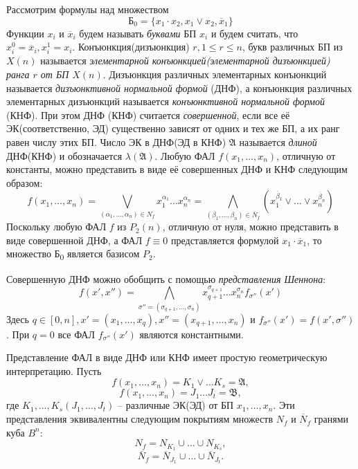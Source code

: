 \documentclass[11pt]{article}
\newcounter{th}\setcounter{th}{0}
\begin{document}
Рассмотрим формулы над множеством
\begin{equation*}
\text{Б}_0 = \{x_1\cdot x_2, x_1\vee x_2, \overline{x}_1\}
\end{equation*}
Функции \(x_i\) и \(\overline{x}_i\) будем называть \emph{буквами} БП \(x_i\) и будем считать, что
\(x_i^0 = \overline{x}_i, x_i^1 = x_i\). Конъюнкция(дизъюнкция) \(r, 1 \leq r \leq n\), букв различных БП из \(X(n)\) называется \emph{элементарной конъюнкцией(элементарной дизъюнкцией) ранга \(r\) от БП \(X(n)\)}. Дизъюнкция различных элементарных конъюнкций называется \emph{дизъюнктивной нормальной формой} (ДНФ), а конъюнкция различных элементарных дизъюнкций называется \emph{конъюнктивной нормальной формой} (КНФ). При этом ДНФ (КНФ) считается \emph{совершенной}, если все её ЭК(соответственно, ЭД) существенно зависят от одних и тех же БП, а их ранг равен числу этих БП. Число ЭК в ДНФ(ЭД в КНФ) \(\mathfrak{A}\) называется \emph{длиной} ДНФ(КНФ) и обозначается \(\lambda(\mathfrak{A})\). Любую ФАЛ \(f(x_1, \ldots, x_n)\), отличную от константы, можно представить в виде её совершенных ДНФ и КНФ следующим образом:
\begin{equation}
f(x_1, \ldots, x_n) = \bigvee\limits_{(\alpha_1, \ldots, \alpha_n) \in N_f}x_1^{\alpha_1}\ldots x_n^{\alpha_n} =
\bigwedge\limits_{(\beta_1, \ldots, \beta_n) \in \overline{N}_f}(x_1^{\overline{\beta}_1}\lor\ldots\lor x_n^{\overline{\beta}_n})
\end{equation}
Поскольку любую ФАЛ \(f\) из \(P_2(n)\), отличную от нуля, можно представить в виде совершенной ДНФ, а ФАЛ \(f \equiv 0\) представляется формулой \(x_1\cdot\overline{x}_1\), то множество Б\textsubscript{0} является базисом \(P_2\).

Совершенную ДНФ можно обобщить с помощью \emph{представления Шеннона}:
\begin{equation}
f(x', x'') = \bigwedge\limits_{\sigma'' = (\sigma_{q + 1}, \ldots, \sigma_n)}x_{q + 1}^{\sigma_{q + 1}}\ldots
x_n^{\sigma_n}f_{\sigma''}(x')
\end{equation}
Здесь \(q \in [0, n], x' = (x_1, \ldots, x_q), x'' = (x_{q + 1}, \ldots, x_n)\) и \(f_{\sigma''}(x') = f(x', \sigma'')\). При \(q = 0\) все ФАЛ \(f_{\sigma''}(x')\) являются константными.

Представление ФАЛ в виде ДНФ или КНФ имеет простую геометрическую интерпретацию. Пусть
\begin{equation}
\label{eq:dnf}
f(x_1, \ldots, x_n) = K_1 \lor \ldots K_s = \mathfrak{A},
\end{equation}
\begin{equation}
\label{eq:knf}
f(x_1, \ldots, x_n) = J_1\ldots J_t = \mathfrak{B},
\end{equation}
где \(K_1, \ldots, K_s(J_1, \ldots, J_t)\) -- различные ЭК(ЭД) от БП \(x_1, \ldots, x_n\). Эти представления эквивалентны следующим покрытиям множеств \(N_f\) и \(\overline{N}_f\) гранями куба \(B^n\):
\begin{equation}
\label{eq:covnf}
N_f = N_{K_1}\cup\ldots\cup N_{K_s},
\end{equation}
\begin{equation}
\label{eq:convnotnf}
\overline{N}_f = \overline{N}_{J_1}\cup\ldots\cup\overline{N}_{J_t}.
\end{equation}
\end{document}
